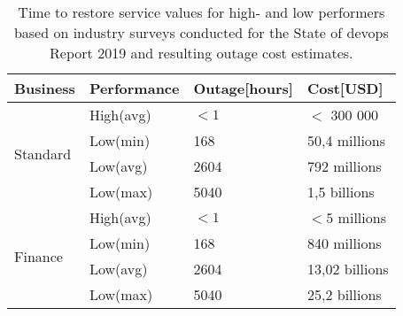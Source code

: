 \documentclass[../main.tex]{subfiles}
\begin{document}
    \begin{table}[h]
        \centering
        \begin{tabular}{llll}
            \toprule
            \textbf{Business} & \textbf{Performance} & \textbf{Outage[hours]} & \textbf{Cost[USD]} \\
            \midrule
            \multirow{4}{*}{Standard}
            & High(avg) & $<1$ & $<$ 300 000 \\
            & Low(min) & 168 & 50,4 millions \\
            & Low(avg) & 2604 & 792 millions \\
            & Low(max) & 5040 & 1,5 billions \\
            \midrule
            \multirow{4}{*}{Finance}
            & High(avg) & $<1$ & $<5$ millions \\
            & Low(min) & 168 & 840 millions \\
            & Low(avg) & 2604 & 13,02 billions \\
            & Low(max) & 5040 & 25,2 billions \\
            \bottomrule
        \end{tabular}
        \captionsetup{justification=centering}
        \caption{
            Time to restore service values for high- and low performers based on industry surveys conducted for the State of \gls{devops} Report 2019 and resulting outage cost estimates.\cite{state_of_devops_19,gartner_outage_cost,itic_outage_cost}
        }
        \label{tab:outage_cost}
    \end{table}
\end{document}
